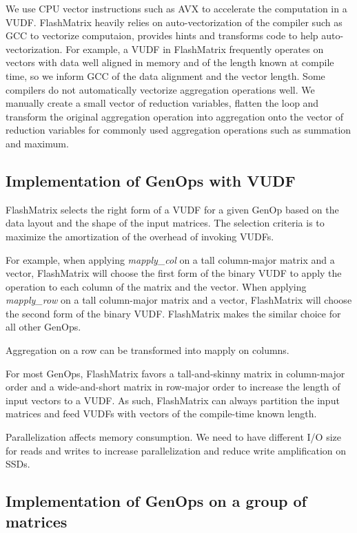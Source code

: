 We use CPU vector instructions such as AVX \cite{avx} to accelerate
the computation in a VUDF. FlashMatrix heavily relies on auto-vectorization
of the compiler such as GCC to vectorize computaion, provides hints and
transforms code to help auto-vectorization. For example, a VUDF in FlashMatrix
frequently operates on vectors with data well aligned in memory and of
the length known at compile time, so we inform GCC of the data alignment
and the vector length. Some compilers do not automatically vectorize
aggregation operations well. We manually create a small vector of reduction
variables, flatten the loop and transform the original aggregation operation
into aggregation onto the vector of reduction variables for commonly used
aggregation operations such as summation and maximum.

\subsection{Implementation of GenOps with VUDF}

FlashMatrix selects the right form of a VUDF for a given GenOp based on the data
layout and the shape of the input matrices. The selection criteria is to maximize
the amortization of the overhead of invoking VUDFs.

For example, when applying \textit{mapply\_col} on
a tall column-major matrix and a vector, FlashMatrix will choose the first form
of the binary VUDF to apply the operation to each column of the matrix and
the vector. When applying \textit{mapply\_row} on a tall column-major matrix
and a vector, FlashMatrix will choose the second form of the binary VUDF.
FlashMatrix makes the similar choice for all other GenOps.

Aggregation on a row can be transformed into mapply on columns.

For most GenOps, FlashMatrix favors a tall-and-skinny matrix in column-major
order and a wide-and-short matrix in row-major order to increase the length
of input vectors to a VUDF. As such, FlashMatrix can always partition the input
matrices and feed VUDFs with vectors of the compile-time known length.

Parallelization affects memory consumption. We need to have different I/O size
for reads and writes to increase parallelization and reduce write amplification
on SSDs.

\subsection{Implementation of GenOps on a group of matrices}

